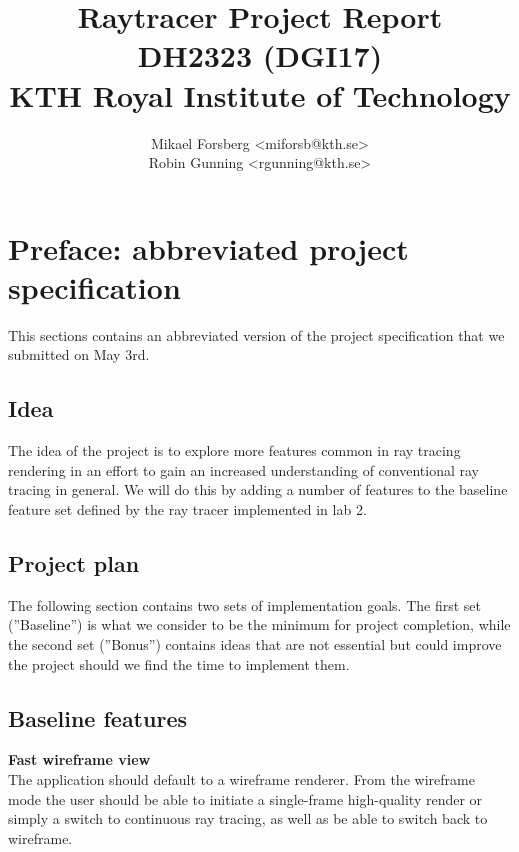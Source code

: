 \documentclass[a4paper,11pt]{article}
\begin{document}
\title{\vspace{-1cm} \Huge Raytracer Project Report\\ \large DH2323 (DGI17)\\ KTH Royal Institute of Technology}
\author{Mikael Forsberg <miforsb@kth.se>\\ Robin Gunning <rgunning@kth.se>}
\maketitle

\newpage
\tableofcontents
\newpage
{}

\section{Preface: abbreviated project specification}
This sections contains an abbreviated version of the project specification that we submitted
on May 3rd.
\vspace{-0.3cm}
\subsection{Idea}
\vspace{-0.3cm}
The idea of the project is to explore more features common in ray tracing rendering
in an effort to gain an increased understanding of conventional ray tracing in general.
We will do this by adding a number of features to the baseline feature set defined by
the ray tracer implemented in lab 2.

\subsection{Project plan}
\vspace{-0.3cm}
The following section contains two sets of implementation goals. The first set (''Baseline'')
is what we consider to be the minimum for project completion, while the second set (''Bonus'')
contains ideas that are not essential but could improve the project should we find the time to
implement them.

\subsection{Baseline features}
\vspace{-0.3cm}
\noindent \textbf{Fast wireframe view}\\
The application should default to a wireframe renderer. From the wireframe mode the user
should be able to initiate a single-frame high-quality render or simply a switch to continuous
ray tracing, as well as be able to switch back to wireframe.
\end{document}
